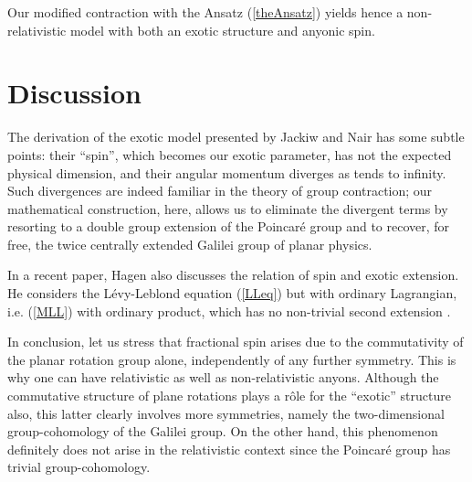 \documentclass[a4paper,11pt]{article}
\let\ssection=\section
\renewcommand{\section}{\setcounter{equation}{0}\ssection}
\begin{document}
Our modified contraction  with the  Ansatz (\ref{theAnsatz})
yields hence a non-relativistic model
with both an exotic structure and anyonic spin.


\section{Discussion}

The derivation of the exotic model presented by Jackiw and Nair
\cite{JaNa2} has
some subtle points: their ``spin'', which becomes our exotic parameter, has
not the expected physical dimension, and their angular momentum diverges as
\coordHE{} tends to infinity. Such divergences are indeed familiar in the theory
of group contraction; our mathematical construction, here, allows us to
eliminate
the divergent terms by resorting to a double group extension of the Poincar\'e
group and to recover, for free, the twice centrally extended Galilei group of
planar physics.

In a recent paper, Hagen \cite{Hagen} also discusses the relation
of spin and exotic extension. He considers the
L\'evy-Leblond equation (\ref{LLeq})
but with ordinary Lagrangian, i.e. (\ref{MLL}) with
ordinary product, which has no  non-trivial second extension \cite{LL}.

In conclusion, let us stress that fractional
spin arises due to the commutativity of the planar rotation
group alone, independently of any further symmetry. This is why one
can have relativistic as well as non-relativistic anyons.
Although the commutative structure of plane rotations plays a r\^ole
for the ``exotic'' structure also, this latter clearly involves more
symmetries, namely the two-dimensional group-cohomology of the Galilei group.
On the other hand, this phenomenon definitely does not arise in the
relativistic context since the Poincar\'e group has trivial group-cohomology.


\goodbreak

\end{document}
